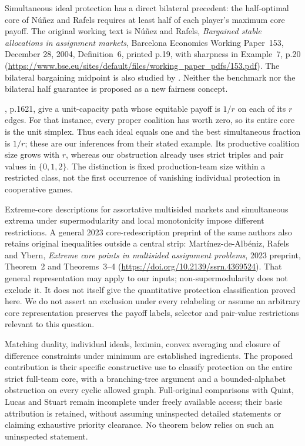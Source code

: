 \documentclass[11pt]{article}
\theoremstyle{remark}\newtheorem{remark}[theorem]{Remark}
\begin{document}
Simultaneous ideal protection has a direct bilateral precedent: the
half-optimal core of N\'u\~nez and Rafels requires at least half of each
player's maximum core payoff. The original working text is N\'u\~nez and
Rafels, \emph{Bargained stable allocations in assignment markets}, Barcelona
Economics Working Paper~153, December 28, 2004, Definition~6, printed p.19,
with sharpness in Example~7, p.20
(\url{https://www.bse.eu/sites/default/files/working_paper_pdfs/153.pdf}).
The bilateral bargaining midpoint is also studied by
\citet{NunezRafels2008}. Neither the benchmark nor the bilateral half guarantee
is proposed as a new fairness concept.

\citet{Gangam2026}, p.1621, give a unit-capacity path whose equitable payoff
is $1/r$ on each of its $r$ edges. For that instance, every proper coalition has worth zero, so its entire
core is the unit simplex. Thus each ideal equals one and the best simultaneous
fraction is $1/r$; these are our inferences from their stated example.
Its productive coalition size grows with $r$, whereas our obstruction already
uses strict triples and pair values in $\{0,1,2\}$. The distinction is fixed
production-team size within a restricted class, not the first occurrence of
vanishing individual protection in cooperative games.

Extreme-core descriptions for assortative multisided markets
\citep{Martinez2020} and simultaneous extrema under supermodularity and local
monotonicity \citep{Martinez2026} impose different restrictions. A general
2023 core-redescription preprint of the same authors also retains original
inequalities outside a central strip: Mart\'inez-de-Alb\'eniz, Rafels and
Ybern, \emph{Extreme core points in multisided assignment problems}, 2023
preprint, Theorem~2 and Theorems~3--4
(\url{https://doi.org/10.2139/ssrn.4369524}).
That general representation may apply to our inputs; non-supermodularity
does not exclude it. It does not itself give the quantitative protection
classification proved here. We do not assert an exclusion under every
relabeling or assume an arbitrary core representation preserves the payoff
labels, selector and pair-value restrictions relevant to this question.

Matching duality, individual ideals, leximin, convex averaging and closure
of difference constraints under minimum are established ingredients. The
proposed contribution is their specific constructive use to classify
protection on the entire strict full-team core, with a branching-tree
argument and a bounded-alphabet obstruction on every cyclic allowed graph.
Full-original comparisons with Quint, Lucas and Stuart remain incomplete
under freely available access; their basic attribution is retained, without
assuming uninspected detailed statements or claiming exhaustive priority
clearance. No theorem below relies on such an uninspected statement.
\end{document}
